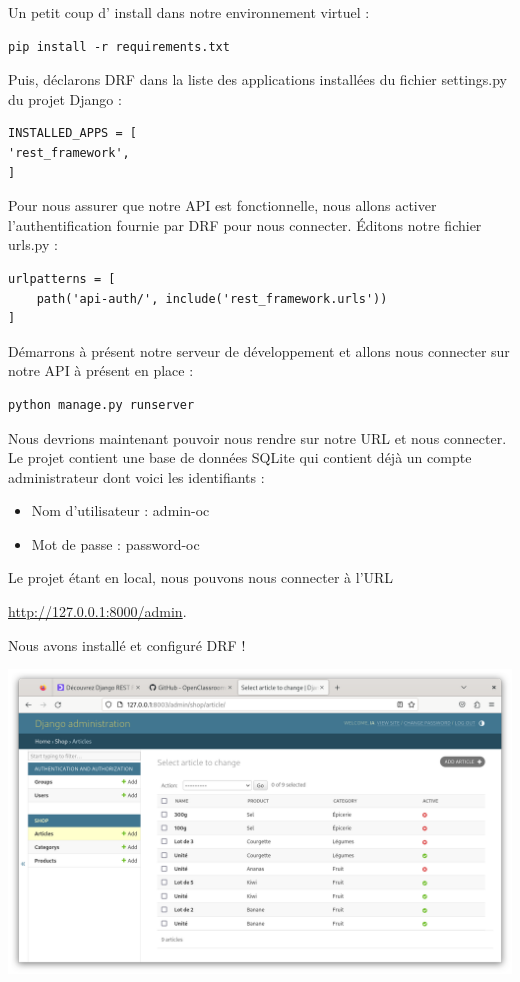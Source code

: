 \documentclass[a4paper]{article}
\begin{document}
Un petit coup d’ install  dans notre environnement virtuel :
\begin{verbatim}
pip install -r requirements.txt
\end{verbatim}

Puis, déclarons DRF dans la liste des applications installées du fichier  settings.py  du projet Django :
\begin{verbatim}
INSTALLED_APPS = [
'rest_framework',
]
\end{verbatim}

Pour nous assurer que notre API est fonctionnelle, nous allons activer l’authentification fournie par DRF pour nous connecter. Éditons notre fichier  urls.py  :
\begin{verbatim}
urlpatterns = [
    path('api-auth/', include('rest_framework.urls'))
]
\end{verbatim}

Démarrons à présent notre serveur de développement et allons nous connecter sur notre API à présent en place :
\begin{verbatim}
python manage.py runserver
\end{verbatim}

Nous devrions maintenant pouvoir nous rendre sur notre URL et nous connecter. Le projet contient une base de données SQLite qui contient déjà un compte administrateur dont voici les identifiants :
\begin{itemize}
\item Nom d’utilisateur : admin-oc
\item Mot de passe : password-oc
\end{itemize}

Le projet étant en local, nous pouvons nous connecter à l’URL

\url{http://127.0.0.1:8000/admin}.

Nous avons installé et configuré DRF !
\begin{center}
\includegraphics[width=15cm]{images/image04.png}
\end{center}
\end{document}
